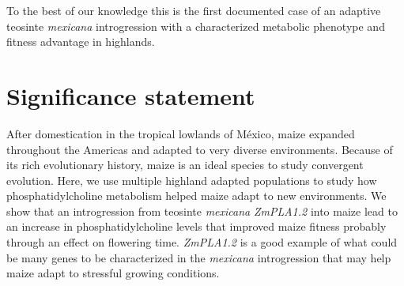 \documentclass[9pt,twocolumn,twoside,lineno]{BioRxiv}
\begin{document}
To the best of our knowledge this is the first documented case of an adaptive teosinte \textit{mexicana} introgression with a characterized metabolic phenotype and fitness advantage in highlands.


\section{Significance statement} 

After domestication in the tropical lowlands of México, maize expanded throughout the Americas and adapted to very diverse environments. 
Because of its rich evolutionary history, maize is an ideal species to study convergent evolution. 
Here, we use multiple highland adapted populations to study how phosphatidylcholine metabolism helped maize adapt to new environments. 
We show that an introgression from teosinte \textit{mexicana} \textit{ZmPLA1.2} into maize lead to an increase in phosphatidylcholine levels that improved maize fitness probably through an effect on flowering time.  
\textit{ZmPLA1.2} is a good example of what could be many genes to be characterized in the \textit{mexicana} introgression that may help maize adapt to stressful growing conditions. 
\end{document}
